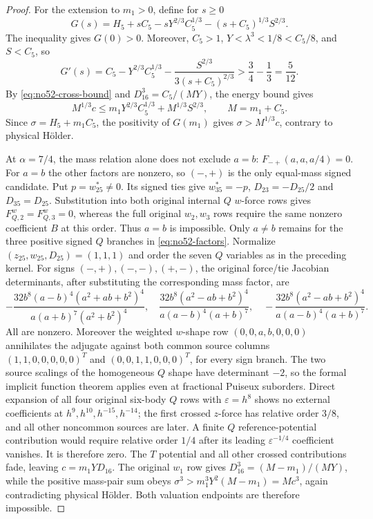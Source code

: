 \documentclass[11pt]{amsart}
\theoremstyle{remark}
\begin{document}
\begin{proof}
For the extension to $m_1>0$, define for $s\ge0$
\[
G(s)=H_5+sC_5-sY^{2/3}C_5^{1/3}-(s+C_5)^{1/3}S^{2/3}.
\]
The inequality gives $G(0)>0$. Moreover, $C_5>1$, $Y<\lambda^3<1/8<C_5/8$, and $S<C_5$, so
\[
G'(s)=C_5-Y^{2/3}C_5^{1/3}-\frac{S^{2/3}}{3(s+C_5)^{2/3}}
>\frac34-\frac13=\frac5{12}.
\]
By \eqref{eq:no52-cross-bound} and $D_{16}^3=C_5/(MY)$, the energy bound gives
\[
M^{1/3}c\le m_1Y^{2/3}C_5^{1/3}+M^{1/3}S^{2/3},\qquad M=m_1+C_5.
\]
Since $\sigma=H_5+m_1C_5$, the positivity of $G(m_1)$ gives $\sigma>M^{1/3}c$, contrary to physical H\"older.

At $\alpha=7/4$, the mass relation alone does not exclude $a=b$: $F_{-+}(a,a,a/4)=0$. For $a=b$ the other factors are nonzero, so $(-,+)$ is the only equal-mass signed candidate. Put $p=w_{25}^*\ne0$. Its signed ties give $w_{35}^*=-p$, $D_{23}=-D_{25}/2$ and $D_{35}=D_{25}$. Substitution into both original internal $Q$ $w$-force rows gives $F^w_{Q,2}=F^w_{Q,3}=0$, whereas the full original $w_2,w_3$ rows require the same nonzero coefficient $B$ at this order. Thus $a=b$ is impossible. Only $a\ne b$ remains for the three positive signed $Q$ branches in \eqref{eq:no52-factors}. Normalize $(z_{25},w_{25},D_{25})=(1,1,1)$ and order the seven $Q$ variables as in the preceding kernel. For signs $(-,+),(-,-),(+,-)$, the original force/tie Jacobian determinants, after substituting the corresponding mass factor, are
\[
-\frac{32b^8(a-b)^4(a^2+ab+b^2)^4}{a(a+b)^7(a^2+b^2)^4},\quad \frac{32b^8(a^2-ab+b^2)^4}{a(a-b)^4(a+b)^7},\quad -\frac{32b^8(a^2-ab+b^2)^4}{a(a-b)^4(a+b)^7}.
\]
All are nonzero. Moreover the weighted $w$-shape row $(0,0,a,b,0,0,0)$ annihilates the adjugate against both common source columns $(1,1,0,0,0,0,0)^T$ and $(0,0,1,1,0,0,0)^T$, for every sign branch. The two source scalings of the homogeneous $Q$ shape have determinant $-2$, so the formal implicit function theorem applies even at fractional Puiseux suborders. Direct expansion of all four original six-body $Q$ rows with $\varepsilon=h^8$ shows no external coefficients at $h^9,h^{10},h^{-15},h^{-14}$; the first crossed $z$-force has relative order $3/8$, and all other noncommon sources are later. A finite $Q$ reference-potential contribution would require relative order $1/4$ after its leading $\varepsilon^{-1/4}$ coefficient vanishes. It is therefore zero. The $T$ potential and all other crossed contributions fade, leaving $c=m_1YD_{16}$. The original $w_1$ row gives $D_{16}^3=(M-m_1)/(MY)$, while the positive mass-pair sum obeys $\sigma^3>m_1^3Y^2(M-m_1)=Mc^3$, again contradicting physical H\"older. Both valuation endpoints are therefore impossible.
\end{proof}
\end{document}
